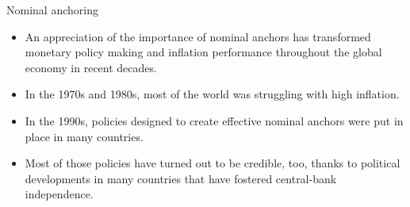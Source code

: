 \documentclass[
  ignorenonframetext,
]{beamer}
\begin{document}
\begin{frame}{Nominal anchoring}
\label{nominal-anchoring}
\begin{itemize}
\item
  An appreciation of the importance of nominal anchors has transformed
  monetary policy making and inflation performance throughout the global
  economy in recent decades.
\item
  In the 1970s and 1980s, most of the world was struggling with high
  inflation.
\item
  In the 1990s, policies designed to create effective nominal anchors
  were put in place in many countries.
\item
  Most of those policies have turned out to be credible, too, thanks to
  political developments in many countries that have fostered
  central-bank independence.
\end{itemize}
\end{frame}
\end{document}
